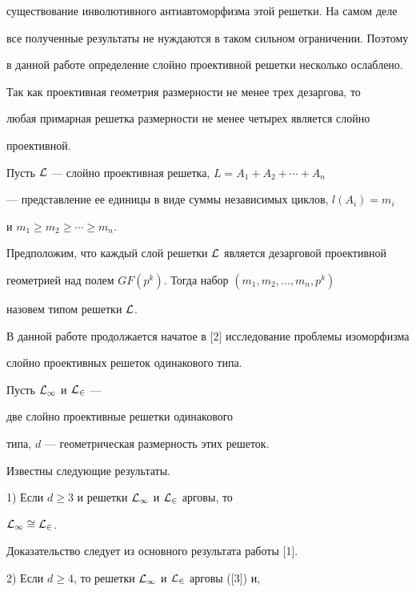 существование инволютивного антиавтоморфизма этой решетки. На самом деле


все полученные результаты не нуждаются в таком сильном ограничении. Поэтому


в данной работе определение слойно проективной решетки несколько ослаблено.





Так как проективная геометрия размерности не менее трех дезаргова, то


любая примарная решетка размерности не менее четырех является слойно


проективной.





Пусть $\cal L$ --- слойно проективная решетка, $L = A_1+A_2+\dotsb+A_n$


--- представление ее единицы в виде суммы независимых циклов, $l(A_i) = m_i$


и $m_1\geq m_2 \geq \dotsb\ge m_n$.


Предположим, что каждый слой решетки $\cal L$ является дезарговой проективной


геометрией над полем $GF(p^k)$. Тогда набор $(m_1,m_2,\dotsc,m_n,p^k)$


назовем типом решетки $\cal L$.





В данной работе продолжается начатое в [2] исследование проблемы изоморфизма


слойно проективных решеток одинакового типа.


Пусть $\cal L_1$ и $\cal L_2$ ---


две слойно проективные решетки одинакового


типа, $d$ --- геометрическая размерность этих решеток.


Известны следующие результаты.





1) Если $d \geq 3$ и решетки $\cal L_1$ и $\cal L_2$ арговы, то


$\cal L_1 \cong \cal L_2$.





Доказательство следует из основного результата работы [1].





2) Если $d \geq 4$, то решетки $\cal L_1$ и $\cal L_2$ арговы ([3]) и,


